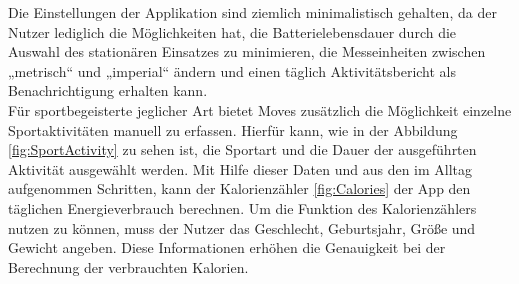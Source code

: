 Die Einstellungen der Applikation sind ziemlich minimalistisch gehalten, da der Nutzer lediglich die Möglichkeiten hat, die Batterielebensdauer durch die Auswahl des stationären Einsatzes zu minimieren, die Messeinheiten zwischen „metrisch“ und „imperial“ ändern und einen täglich Aktivitätsbericht als Benachrichtigung erhalten kann. 
\\
Für sportbegeisterte jeglicher Art bietet Moves zusätzlich die Möglichkeit einzelne Sportaktivitäten manuell zu erfassen.
Hierfür kann, wie in der Abbildung \ref{fig:SportActivity} zu sehen ist, die Sportart und die Dauer der ausgeführten Aktivität ausgewählt werden.
Mit Hilfe dieser Daten und aus den im Alltag aufgenommen Schritten, kann der Kalorienzähler \ref{fig:Calories} der App den täglichen Energieverbrauch berechnen.
Um die Funktion des Kalorienzählers nutzen zu können, muss der Nutzer das Geschlecht, Geburtsjahr, Größe und Gewicht angeben.
Diese Informationen erhöhen die Genauigkeit bei der Berechnung der verbrauchten Kalorien.
\\
